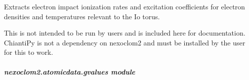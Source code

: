 \documentclass[letterpaper,10pt,english]{sphinxmanual}
\begin{document}
\sphinxAtStartPar
Extracts electron impact ionization rates and excitation coefficients for
electron densities and temperatures relevant to the Io torus.

\sphinxAtStartPar
This is not intended to be run by users and is included here for documentation.
ChiantiPy is not a dependency on nexoclom2 and must be installed by the user
for this to work.

\begin{fulllineitems}
\label{\detokenize{nexoclom2/nexoclom2.atomicdata.extract_eimp_coefs:nexoclom2.atomicdata.extract_eimp_coefs.compute_EImpCoef}}
\pysigstartsignatures
\pysiglinewithargsret
{}
{\sphinxparamcomma {}}
{}
\pysigstopsignatures
\end{fulllineitems}


\sphinxstepscope


\subparagraph{nexoclom2.atomicdata.gvalues module}
\label{\detokenize{nexoclom2/nexoclom2.atomicdata.gvalues:module-nexoclom2.atomicdata.gvalues}}\label{\detokenize{nexoclom2/nexoclom2.atomicdata.gvalues:nexoclom2-atomicdata-gvalues-module}}\label{\detokenize{nexoclom2/nexoclom2.atomicdata.gvalues::doc}}
\end{document}
